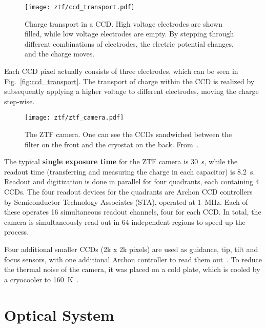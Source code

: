 \begin{figure}[htb]
    \texttt{[image: ztf/ccd\_transport.pdf]}
    \caption[Charge transport in a CCD]{Charge transport in a CCD. High voltage electrodes are shown filled, while low voltage electrodes are empty. By stepping through different combinations of electrodes, the electric potential changes, and the charge moves.}
\end{figure}

Each CCD pixel actually consists of three electrodes, which can be seen in Fig.~\ref{fig:ccd_transport}. The transport of charge within the CCD is realized by subsequently applying a higher voltage to different electrodes, moving the charge step-wise.

\begin{figure}[htb]
    \texttt{[image: ztf/ztf\_camera.pdf]}
    \caption[ZTF camera]{The ZTF camera. One can see the CCDs sandwiched between the filter on the front and the cryostat on the back. From~\cite{Bellm2019}.}
\end{figure}

The typical \textbf{single exposure time} for the ZTF camera is \SI{30}{\second}, while the readout time (transferring and measuring the charge in each capacitor) is \SI{8.2}{\second}. Readout and digitization is done in parallel for four quadrants, each containing 4 CCDs. The four readout devices for the quadrants are Archon CCD controllers by Semiconductor Technology Associates (STA), operated at \SI{1}{\mega\Hz}. Each of these operates 16 simultaneous readout channels, four for each CCD. In total, the camera is simultaneously read out in 64 independent regions to speed up the process.

Four additional smaller CCDs (2k x 2k pixels) are used as guidance, tip, tilt and focus sensors, with one additional Archon controller to read them out~. To reduce the thermal noise of the camera, it was placed on a cold plate, which is cooled by a cryocooler to \SI{160}{\kelvin}~\cite{Dekany2016}.

\section{Optical System}


